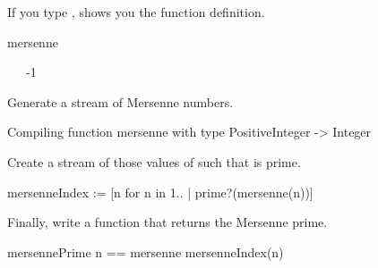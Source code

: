 \begin{xtc}
\begin{xtccomment}
If you type , \Language{} shows you
the function definition.
\end{xtccomment}
\begin{spadsrc}
mersenne 
\end{spadsrc}
\begin{TeXOutput}
\begin{fricasmath}{6}
\ \ \SYMBOL{==}\ -{1}%
\end{fricasmath}
\end{TeXOutput}
\end{xtc}
\begin{xtc}
\begin{xtccomment}
Generate a stream of Mersenne numbers.
\end{xtccomment}
\begin{spadsrc}
\end{spadsrc}
\begin{MessageOutput}
   Compiling function mersenne with type PositiveInteger -> Integer 
\end{MessageOutput}
\begin{TeXOutput}
\begin{fricasmath}{7}
%
\end{fricasmath}
\end{TeXOutput}
\end{xtc}
\begin{xtc}
\begin{xtccomment}
Create a stream of those values of  such that
 is prime.
\end{xtccomment}
\begin{spadsrc}
mersenneIndex := [n for n in 1.. | prime?(mersenne(n))] 
\end{spadsrc}
\begin{TeXOutput}
\begin{fricasmath}{8}
%
\end{fricasmath}
\end{TeXOutput}
\end{xtc}
\begin{xtc}
\begin{xtccomment}
Finally, write a function that returns the  Mersenne
prime.
\end{xtccomment}
\begin{spadsrc}
mersennePrime n == mersenne mersenneIndex(n) 
\end{spadsrc}
\end{xtc}
